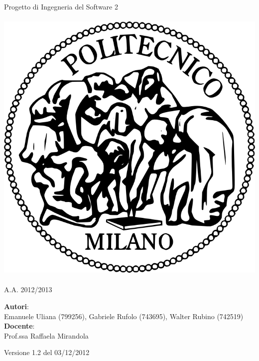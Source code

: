 \documentclass[a4paper,12pt]{article}
\begin{document}
\vspace*{\fill}
\begin{center}
{\fontsize{28}{10} \selectfont Progetto di Ingegneria del Software 2 \\[2\baselineskip]} {\fontsize{42}{10} \selectfont {\bfseries SWIMv2}} \\[4\baselineskip]
\includegraphics[scale=0.4]{polimi} \\[4\baselineskip]
{\fontsize{28}{10} \selectfont {\bfseries Planning Document} \\[2\baselineskip] A.A. 2012/2013}
\end{center}
\begin{flushleft}
{\fontsize{18}{10}
{\bfseries Autori}: \\ Emanuele Uliana (799256), Gabriele Rufolo (743695), Walter Rubino (742519) \\[1\baselineskip]
{\bfseries Docente}: \\ Prof.ssa Raffaela Mirandola
}
\end{flushleft}
\vspace*{\fill}
\begin{center}
Versione 1.2 del 03/12/2012 \\
\end{center}

\clearpage
\end{document}

